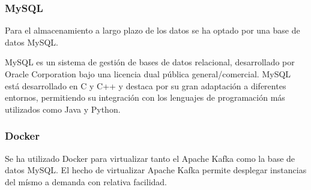 \subsubsection{MySQL}
Para el almacenamiento a largo plazo de los datos se ha optado por una base de datos MySQL.

MySQL es un sistema de gestión de bases de datos relacional, desarrollado por Oracle Corporation bajo una licencia dual pública general/comercial.
MySQL está desarrollado en C y C++ y destaca por su gran adaptación a diferentes entornos, permitiendo su integración con los lenguajes de programación más utilizados como Java y Python.

\subsubsection{Docker}
Se ha utilizado Docker para virtualizar tanto el Apache Kafka como la base de datos MySQL. El hecho de virtualizar Apache Kafka permite desplegar instancias del mísmo a demanda con relativa facilidad.

\clearpage